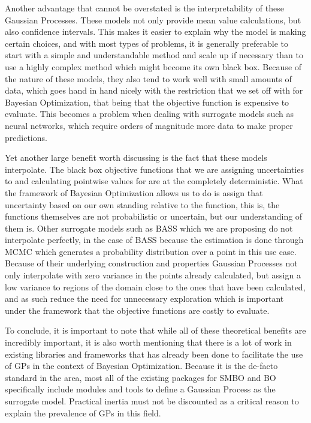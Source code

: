 Another advantage that cannot be overstated is the interpretability of these Gaussian Processes. These models not only provide mean value calculations, but also confidence intervals. This makes it easier to explain why the model is making certain choices, and with most types of problems, it is generally preferable to start with a simple and understandable method and scale up if necessary than to use a highly complex method which might become its own black box. Because of the nature of these models, they also tend to work well with small amounts of data, which goes hand in hand nicely with the restriction that we set off with for Bayesian Optimization, that being that the objective function is expensive to evaluate. This becomes a problem when dealing with surrogate models such as neural networks, which require orders of magnitude more data to make proper predictions. 

Yet another large benefit worth discussing is the fact that these models interpolate. The black box objective functions that we are assigning uncertainties to and calculating pointwise values for are at the completely deterministic. What the framework of Bayesian Optimization allows us to do is assign that uncertainty based on our own standing relative to the function, this is, the functions themselves are not probabilistic or uncertain, but our understanding of them is. Other surrogate models such as BASS which we are proposing do not interpolate perfectly, in the case of BASS because the estimation is done through MCMC which generates a probability distribution over a point in this use case. Because of their underlying construction and properties Gaussian Processes not only interpolate with zero variance in the points already calculated, but assign a low variance to regions of the domain close to the ones that have been calculated, and as such reduce the need for unnecessary exploration which is important under the framework that the objective functions are costly to evaluate.

To conclude, it is important to note that while all of these theoretical benefits are incredibly important, it is also worth mentioning that there is a lot of work in existing libraries and frameworks that has already been done to facilitate the use of GPs in the context of Bayesian Optimization. Because it is the de-facto standard in the area, most all of the existing packages for SMBO and BO specifically include modules and tools to define a Gaussian Process as the surrogate model. Practical inertia must not be discounted as a critical reason to explain the prevalence of GPs in this field. 

